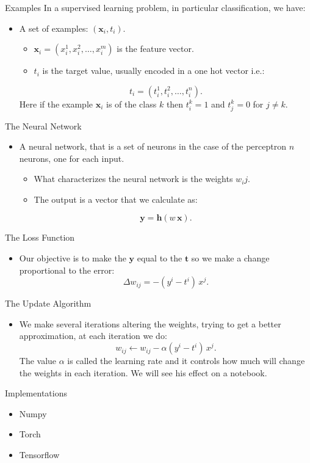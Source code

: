 \documentclass[presentation]{beamer}
\begin{document}
\begin{frame}[label={sec:org3aeded0}]{Examples}
In a supervised learning problem, in particular classification, we have:

\begin{itemize}
\item A set of examples: \((\mathbf{x}_i, t_i)\).
\begin{itemize}
\item \(\mathbf{x}_i = (x_i^1, x_i^2, \dots, x_i^m)\) is the feature vector.
\item \(t_i\) is the target value, usually encoded in a one hot vector i.e.:
\end{itemize}
\[
    t_i = (t_i^1, t_i^2, \dots,t_i^n).
  \]
Here if the example \(\mathbf{x}_i\) is of the class \(k\) then \(t_i^k = 1\) and \(t_j^k = 0\) for \(j \neq k\).
\end{itemize}
\end{frame}

\begin{frame}[label={sec:org6343d95}]{The Neural Network}
\begin{itemize}
\item A neural network, that is a set of neurons in the case of the perceptron \(n\) neurons, one for each input.
\begin{itemize}
\item What characterizes the neural network is the weights \(w_ij\).
\item The output is a vector that we calculate as:
\end{itemize}
\[
    \mathbf{y} = \mathbf{h} \left( w \, \mathbf{x} \right).
  \]
\end{itemize}
\end{frame}

\begin{frame}[label={sec:org0928ee7}]{The Loss Function}
\begin{itemize}
\item Our objective is to make the \(\mathbf{y}\) equal to the \(\mathbf{t}\) so we make a change proportional to the error:
\[
     \Delta w_{ij} = - (y^i - t^i) \, x^j.
  \]
\end{itemize}
\end{frame}

\begin{frame}[label={sec:org86b9786}]{The Update Algorithm}
\begin{itemize}
\item We make several iterations altering the weights, trying to get a better approximation, at each iteration we do:
\[
    w_{ij} \leftarrow w_{ij} - \alpha (y^i - t^i) \, x^j.
  \]
The value \(\alpha\) is called the learning rate and it controls how much will change the weights in each iteration. We will see his effect on a notebook.
\end{itemize}
\end{frame}


\begin{frame}[label={sec:org7174d24}]{Implementations}
\begin{itemize}
\item Numpy
\item Torch
\item Tensorflow
\end{itemize}
\end{frame}
\end{document}

